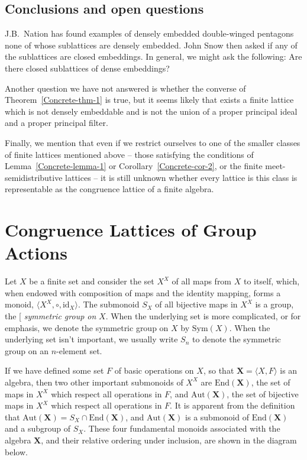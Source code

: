 \documentclass[cm,dissertation,actual,final]{uhthesis}
\theoremstyle{plain}
\theoremstyle{definition}
\theoremstyle{remark}
\numberwithin{theorem}{section}
\numberwithin{claim}{chapter}
\numberwithin{equation}{section}
\numberwithin{conjecture}{chapter}
\newcommand{\<}{\ensuremath{\langle}}
\renewcommand{\>}{\ensuremath{\rangle}}
\newcommand{\End}{\ensuremath{\mathrm{End}}}
\newcommand{\Aut}{\ensuremath{\mathrm{Aut}}}
\newcommand{\Sym}{\ensuremath{\mathrm{Sym}}}
\newcommand{\0}{\ensuremath{\mathbf{0}}}
\newcommand{\1}{\ensuremath{\mathbf{1}}}
\newcommand{\2}{\ensuremath{\mathbf{2}}}
\newcommand{\3}{\ensuremath{\mathbf{3}}}
\newcommand{\4}{\ensuremath{\mathbf{4}}}
\newcommand{\5}{\ensuremath{\mathbf{5}}}
\newcommand{\bX}{\ensuremath{\mathbf{X}}}
\newcommand{\id}{\ensuremath{\mathrm{id}}}
\newcommand{\indexit}[1]{\index{#1|textit}}
\def\defn#1{\gdef\defnstring{#1}%
  \xdef\dodefnii{{\noexpand\em
       \defnstring}\noexpand\indexit{\defnstring}\noexpand\makeatother}%
  \futurelet\nextthing\dodefn}
\def\dodefn{%
  \ifx\nextthing[\let\next=\dodefni
    \else\let\next=\dodefnii\fi
  \makeatletter
  \next}
\def\dodefni[#1]{%
  {\em\defnstring}%
  \indexit{#1}%
  \makeatother}
\begin{document}
\section{Conclusions and open questions}

J.B.~Nation has found examples of densely embedded double-winged pentagons
  none of whose sublattices are densely embedded.  John Snow then asked if any
  of the sublattices are closed embeddings.  In general, we might ask the
  following: Are there closed sublattices of dense embeddings?

Another question we have not answered is whether the converse of
Theorem~\ref{Concrete-thm-1} is true, but it seems likely that 
exists a finite lattice which is not densely embeddable and is not the union of 
a proper principal ideal and a proper principal filter. 

Finally, we mention that even if we restrict ourselves to one of the smaller
classes of finite lattices mentioned above -- those satisfying the conditions of
Lemma~\ref{Concrete-lemma-1} or Corollary~\ref{Concrete-cor-2}, or the 
finite meet-semidistributive lattices -- it is still unknown whether every
lattice is this class is representable as the congruence lattice of a finite
algebra.  

\chapter{Congruence Lattices of Group Actions}
\label{cha:congr-latt-group}
Let $X$ be a finite set and consider the set $X^X$ of all maps from $X$ to
itself, which, when endowed with composition of maps and the identity mapping,
forms a monoid, $\<X^X, \circ, \id_X\>$.  The submonoid $S_X$ of all bijective
maps in $X^X$ is a group, the \defn{symmetric group on} $X$.  When the
underlying set is more complicated, or for emphasis, we denote the symmetric
group on $X$ by $\Sym(X)$.  When the  
underlying set isn't important, we usually write $S_n$ to denote the
symmetric group on an $n$-element set. 

If we have defined some set $F$ of basic operations on $X$, so that
$\bX = \<X, F\>$ is an algebra, then two other important submonoids of
$X^X$ are $\End(\bX)$, the set of maps in $X^X$ which respect all 
operations in $F$, and $\Aut(\bX)$, the set of bijective maps in  $X^X$ which
respect all operations in $F$.  It is apparent from the definition that
$\Aut(\bX)= S_X \cap \End(\bX)$, and  $\Aut(\bX)$ is a submonoid of $\End(\bX)$
and a subgroup of $S_X$.  These four fundamental monoids associated with the
algebra $\bX$, and their relative ordering under inclusion, are shown in the diagram
below. 
\end{document}
